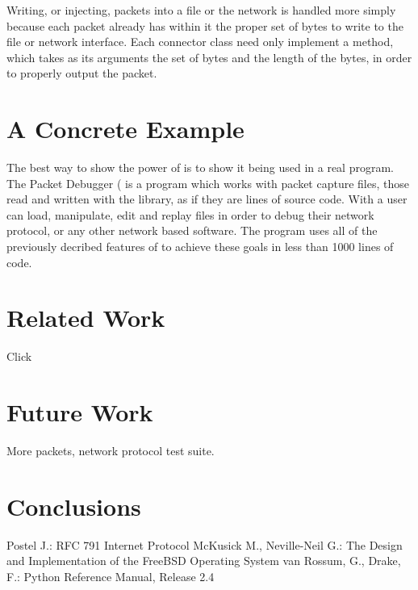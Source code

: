 \documentclass{sig-alternate-10pt}
\begin{document}
Writing, or injecting, packets into a file or the network is handled
more simply because each packet already has within it the proper set
of bytes to write to the file or network interface.  Each connector
class need only implement a  method, which takes as its
arguments the set of bytes and the length of the bytes, in order to
properly output the packet.

\section{A Concrete Example}
\label{sec:a-concrete-example}

The best way to show the power of  is to show it being
used in a real program.  The Packet Debugger ( is a
program which works with packet capture files, those read and written
with the  library\cite{}, as if they are lines of source
code.  With  a user can load, manipulate, edit and replay
 files in order to debug their network protocol, or any
other network based software.  The  program uses all of
the previously decribed features of  to achieve these
goals in less than 1000 lines of code.


\section{Related Work}
\label{sec:related-work}

Click

\section{Future Work}
\label{sec:future-work}

More packets, network protocol test suite.

\section{Conclusions}
\label{sec:conclusions}

\label{sec:bibliography}
\begin{thebibliography}{99} 
 Postel J.: 
RFC 791 Internet Protocol
 McKusick M., Neville-Neil G.:
The Design and Implementation of the FreeBSD Operating System
 van Rossum, G., Drake, F.:
Python Reference Manual, Release 2.4
\end{thebibliography}
\end{document}
